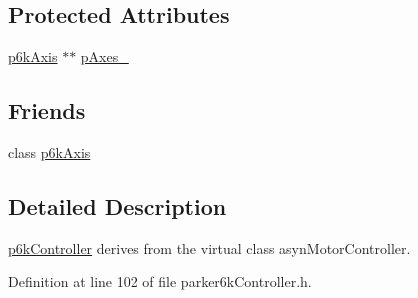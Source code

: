 \subsection*{Protected Attributes}
\begin{DoxyCompactItemize}
\item 
\hyperlink{classp6kAxis}{p6kAxis} $\ast$$\ast$ \hyperlink{classp6kController_a2c283d187ff47b5dd24c3fcd68b1cfa3}{pAxes\_\-}
\end{DoxyCompactItemize}
\subsection*{Friends}
\begin{DoxyCompactItemize}
\item 
\hypertarget{classp6kController_a0504dedd856d6bb91dbd02c649908922}{
class \hyperlink{classp6kController_a0504dedd856d6bb91dbd02c649908922}{p6kAxis}}
\label{classp6kController_a0504dedd856d6bb91dbd02c649908922}

\end{DoxyCompactItemize}


\subsection{Detailed Description}
\hyperlink{classp6kController}{p6kController} derives from the virtual class asynMotorController. 

Definition at line 102 of file parker6kController.h.

